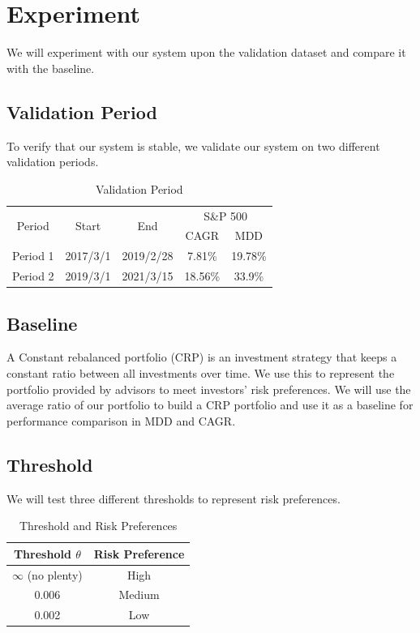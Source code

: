 \section{Experiment}
We will experiment with our system upon the validation dataset and compare it with the baseline.
\subsection{Validation Period}
To verify that our system is stable, we validate our system on two different validation periods. 
\begin{table}[htb]
    \centering
    \begin{tabular}{|c|c|c|c|c|}
    \hline
    \multirow{2}{*}{Period} &
    \multirow{2}{*}{Start} &
    \multirow{2}{*}{End} &
    \multicolumn{2}{c|}{S\&P 500} \\ 
    \cline{4-5} &{} &{} & CAGR & MDD \\ \hline
    Period 1 & 2017/3/1 & 2019/2/28 & 7.81\% & 19.78\% \\ \hline
    Period 2 & 2019/3/1 & 2021/3/15 & 18.56\% & 33.9\% \\    
    \hline
    \end{tabular}
    \caption{Validation Period}
    \label{tab:validation_period}
\end{table}




\subsection{Baseline}
A Constant rebalanced portfolio (CRP) is an investment strategy that keeps a constant ratio between all investments over time. We use this to represent the portfolio provided by advisors to meet investors' risk preferences. We will use the average ratio of our portfolio to build a CRP portfolio and use it as a baseline for performance comparison in MDD and CAGR.
\subsection{Threshold}
We will test three different thresholds to represent risk preferences.  
\begin{table}[htb]
    \centering
    \begin{tabular}{|c|c|}
    \hline \hline
    Threshold $\theta$ & Risk Preference \\ \hline
    $\infty$  (no plenty) & High \\ \hline
    0.006 & Medium      \\ \hline
    0.002 & Low      \\ \hline    
    \hline
    \end{tabular}
    \caption{Threshold and Risk Preferences}
    \label{tab:threshold}
\end{table}
